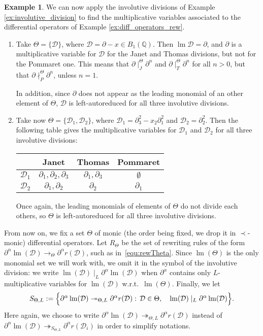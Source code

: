 \documentclass[10pt]{easychair}
\theoremstyle{definition}
\newtheorem{example}[theorem]{Example}
\newcommand\D{\mathcal{D}}
\DeclareMathOperator{\lm}{lm}
\newcommand\Q{\mathbb{Q}}
\newcommand\Weyl[1]{B_{#1}(\Q)}
\newcommand\rewTheta{\to_\Theta}
\newcommand\rewThetaS[1]{\twoheadrightarrow_{\Theta,#1}}
\newcommand\divInv[1]{\mid_{#1}}
\newcommand\RTheta{R_{\Theta}}
\newcommand\SThetaL{S_{\Theta,L}}
\begin{document}
\begin{example}\label{ex:multiplicative_variables}
  We can now apply the involutive divisions of Example
  \ref{ex:involutive_division} to find the multiplicative variables associated
  to the differential operators of Example \ref{ex:diff_operators_rew}.
  \begin{enumerate}
  \item Take $\Theta = \{\D\}$, where $\D = \partial - x \in \Weyl 1$. Then
    $\lm \D = \partial$, and $\partial$ is a multiplicative variable for $\D$ for the Janet
    and Thomas divisions, but not for the Pommaret one. This means that
    $\partial \divInv{J}^\Theta \partial^n$ and $\partial \divInv{T}^\Theta \partial^n$ for all
    $n > 0$, but that $\partial \nmid_P^\Theta \partial^n$, unless $n = 1$.

    In addition, since $\partial$ does not appear as the leading monomial of an other
    element of $\Theta$, $\D$ is left-autoreduced for all three involutive divisions.
  \item Take now $\Theta = \{\D_1,\D_2\}$, where
    $\D_1 = \partial_3^2 - x_2\partial_1^2$ and $\D_2 = \partial_2^2$. Then the following table gives
    the multiplicative variables for $\D_1$ and $\D_2$ for all three involutive divisions:
    \begin{center}
    \begin{tabular}{l|ccc}
      & Janet & Thomas & Pommaret \\ \hline
      $\D_1$ & $\partial_1, \partial_2, \partial_3$ & $\partial_1, \partial_3$ & $\emptyset$ \\
      $\D_2$ & $\partial_1, \partial_2$ & $\partial_2$ & $\partial_1$ \\
    \end{tabular}
  \end{center}

  Once again, the leading monomials of elements of $\Theta$ do not divide each
  others, so $\Theta$ is left-autoreduced for all three involutive divisions.
  \end{enumerate}
\end{example}
\smallskip


From now on, we fix a set $\Theta$ of monic (the order being fixed, we
drop it in $\prec$-monic) differential operators. Let $\RTheta$  be the
set of rewriting rules of the form
$\partial^\alpha\lm(\D)\rewTheta\partial^\alpha r(\D)$, such as
in~\eqref{equ:rewTheta}. Since $\lm(\Theta)$ is the only monomial set we
will work with, we omit it in the symbol of the involutive division: we
write $\lm(\D)\divInv{L}\partial^\alpha\lm(\D)$ when $\partial^\alpha$
contains only $L$-multiplicative variables for $\lm(\D)$ w.r.t.\
$\lm(\Theta)$. Finally, we let
\begin{equation}\label{equ:S-strategy}
  \SThetaL:=\Big\{\partial^\alpha\lm(\D)\rewThetaS{L}\partial^\alpha
  r(\D) : \, \D\in\Theta,\quad\lm(\D)\divInv{L}\partial^\alpha\lm(\D)\Big\}.
  \smallskip
\end{equation}
Here again, we choose to write
$\partial^\alpha\lm(\D)\rewThetaS{L}\partial^\alpha r(\D)$ instead of
$\partial^\alpha\lm(\D)\twoheadrightarrow_{\SThetaL}\partial^\alpha
r(\D_i)$ in order to simplify notations.
\smallskip
\end{document}
